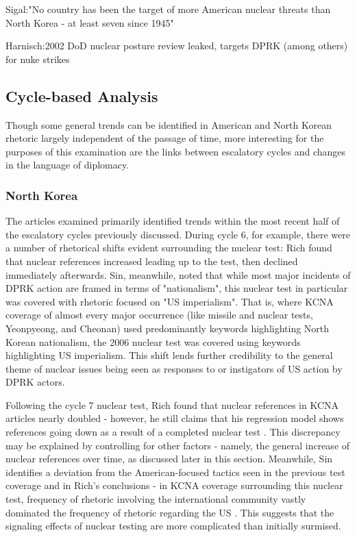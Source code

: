 \documentclass{article}
\begin{document}
Sigal:"No country has been the target of more American nuclear threats than North Korea - at least seven since 1945"

Harnisch:2002 DoD nuclear posture review leaked, targets DPRK (among others) for nuke strikes


\subsection{Cycle-based Analysis}
Though some general trends can be identified in American and North Korean rhetoric largely independent of the passage of time, more interesting for the purposes of this examination are the links between escalatory cycles and changes in the language of diplomacy. 

\subsubsection{North Korea}

The articles examined primarily identified trends within the most recent half of the escalatory cycles previously discussed. During cycle 6, for example, there were a number of rhetorical shifts evident surrounding the nuclear test: Rich found that nuclear references increased leading up to the test, then declined immediately afterwards\cite{rich14}. Sin, meanwhile, noted that while most major incidents of DPRK action are framed in terms of "nationalism", this nuclear test in particular was covered with rhetoric focused on "US imperialism"\cite{sin}. That is, where KCNA coverage of almost every major occurrence (like missile and nuclear tests, Yeonpyeong, and Cheonan) used predominantly keywords highlighting North Korean nationalism, the 2006 nuclear test was covered using keywords highlighting US imperialism. This shift lends further credibility to the general theme of nuclear issues being seen as responses to or instigators of US action by DPRK actors.

Following the cycle 7 nuclear test, Rich found that nuclear references in KCNA articles nearly doubled - however, he still claims that his regression model shows references going down as a result of a completed nuclear test \cite{rich14}. This discrepancy may be explained by controlling for other factors - namely, the general increase of nuclear references over time, as discussed later in this section. Meanwhile, Sin identifies a deviation from the American-focused tactics seen in the previous test coverage and in Rich's conclusions - in KCNA coverage surrounding this nuclear test, frequency of rhetoric involving the international community vastly dominated the frequency of rhetoric regarding the US \cite{sin}. This suggests that the signaling effects of nuclear testing are more complicated than initially surmised.
\end{document}
